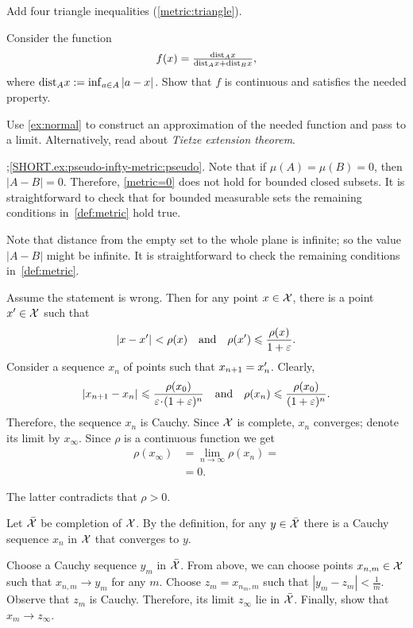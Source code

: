 Add four triangle inequalities (\ref{metric:triangle}).

Consider the function 
\[f(x)=\tfrac{\mathrm{dist}_Ax}{\mathrm{dist}_Ax+\mathrm{dist}_Bx},\]
where $\distfun_Ax\z\df\inf_{a\in A}\dist{a}{x}{}$.
Show that $f$ is continuous and satisfies the needed property.

Use \ref{ex:normal} to construct an approximation of the needed function and pass to a limit.
Alternatively, read about \emph{Tietze extension theorem}.

\parbf{\ref{ex:pseudo-infty-metric}};\ref{SHORT.ex:pseudo-infty-metric:pseudo}.
Note that if $\mu(A)=\mu(B)=0$, then $|A-B|=0$.
Therefore, \ref{metric=0} does not hold for bounded closed subsets.
It is straightforward to check that for bounded measurable sets the remaining conditions in~\ref{def:metric} hold true.


Note that distance from the empty set to the whole plane is infinite; so the value $|A-B|$ might be infinite.
It is straightforward to check the remaining conditions in~\ref{def:metric}.


Assume the statement is wrong. 
Then for any point $x\in \mathcal{X}$, there is a point $x'\in \mathcal{X}$ such that 
\[\dist{x}{x'}{}< \rho(x)
\quad\text{and}\quad
\rho(x')\le\frac{\rho(x)}{1+\eps}.\]
Consider a sequence $x_n$ of points such that $x_{n+1}\z=x_n'$.
Clearly, 
\[\dist{x_{n+1}}{x_n}{}
\le
\frac{\rho(x_0)}{\eps\cdot(1+\eps)^n}
\quad\hbox{and}\quad
\rho(x_n)\le \frac{\rho(x_0)}{(1+\eps)^n}.\] 
Therefore, the sequence $x_n$ is Cauchy.
Since $\mathcal{X}$ is complete, $x_n$ converges;
denote its limit by $x_\infty$.
Since $\rho$ is a continuous function we get
\begin{align*}\rho(x_\infty)&=\lim_{n\to\infty}\rho(x_n)=
\\&=0.
\end{align*}

The latter contradicts that $\rho>0$.

Let $\bar {\mathcal{X}}$ be completion of $\mathcal{X}$.
By the definition, for any $y\in \bar {\mathcal{X}}$ there is a Cauchy sequence $x_n$ in  $\mathcal{X}$ that converges to $y$.

Choose a Cauchy sequence $y_m$ in $\bar {\mathcal{X}}$.
From above, we can choose points $x_{n,m}\in \mathcal{X}$ such that $x_{n,m}\to y_m$ for any $m$.
Choose $z_m=x_{n_m,m}$ such that $|y_m-z_m|<\tfrac1m$.
Observe that $z_m$ is Cauchy.
Therefore, its limit $z_\infty$ lie in $\bar{\mathcal{X}}$.
Finally, show that $x_m\to z_\infty$.

